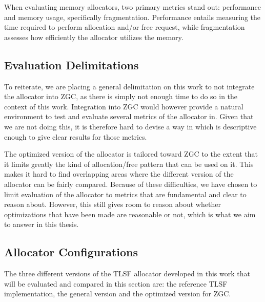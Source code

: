 
When evaluating memory allocators, two primary metrics stand out: performance and memory usage, specifically fragmentation. Performance entails measuring the time required to perform allocation and/or free request, while fragmentation assesses how efficiently the allocator utilizes the memory.

\subsection{Evaluation Delimitations}

To reiterate, we are placing a general delimitation on this work to not integrate the allocator into ZGC, as there is simply not enough time to do so in the context of this work. Integration into ZGC would however provide a natural environment to test and evaluate several metrics of the allocator in. Given that we are not doing this, it is therefore hard to devise a way in which is descriptive enough to give clear results for those metrics.

The optimized version of the allocator is tailored toward ZGC to the extent that it limits greatly the kind of allocation/free pattern that can be used on it. This makes it hard to find overlapping areas where the different version of the allocator can be fairly compared. Because of these difficulties, we have chosen to limit evaluation of the allocator to metrics that are fundamental and clear to reason about. However, this still gives room to reason about whether optimizations that have been made are reasonable or not, which is what we aim to answer in this thesis.

\subsection{Allocator Configurations}



The three different versions of the TLSF allocator developed in this work that will be evaluated and compared in this section are: the reference TLSF implementation, the general version and the optimized version for ZGC. 


